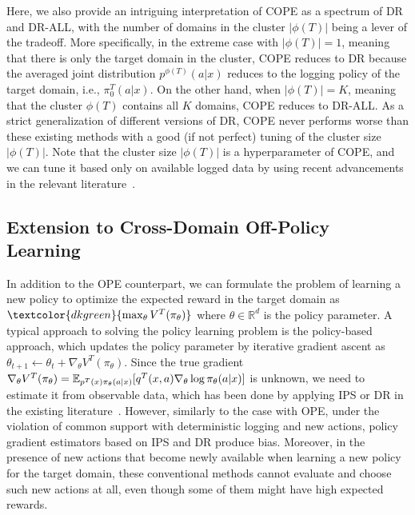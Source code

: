\documentclass{article} %
\theoremstyle{definition}
\begin{document}
Here, we also provide an intriguing interpretation of COPE as a spectrum of DR and DR-ALL, with the number of domains in the cluster $|\phi(T)|$ being a lever of the tradeoff. More specifically, in the extreme case with $|\phi(T)|=1$, meaning that there is only the target domain in the cluster, COPE reduces to DR because the averaged joint distribution $p^{\phi(T)}(a|x)$ reduces to the logging policy of the target domain, i.e., $\pi_0^T(a|x)$. On the other hand, when $|\phi(T)|=K$, meaning that the cluster $\phi(T)$ contains all $K$ domains, COPE reduces to DR-ALL. As a strict generalization of different versions of DR, COPE never performs worse than these existing methods with a good (if not perfect) tuning of the cluster size $|\phi(T)|$. Note that the cluster size $|\phi(T)|$ is a hyperparameter of COPE, and we can tune it based only on available logged data by using recent advancements in the relevant literature~\citep{su2020adaptive,udagawa2023policy,felicioni2024autoope,cief2024cross}.


\subsection{Extension to Cross-Domain Off-Policy Learning}
In addition to the OPE counterpart, we can formulate the problem of learning a new policy to optimize the expected reward in the target domain as $\textcolor{dkgreen}{\max_{\theta} V^T(\pi_{\theta})}$ where $\theta \in \mathbb{R}^{d}$ is the policy parameter. 
A typical approach to solving the policy learning problem is the policy-based approach, which updates the policy parameter by iterative gradient ascent as $\theta_{t+1} \leftarrow \theta_{t} + \nabla_{\theta}V^T(\pi_{\theta})$. 
Since the true gradient $\nabla_{\theta}V^T(\pi_{\theta})=\mathbb{E}_{p^T(x)\pi_{\theta}(a|x)}[q^T(x,a)\nabla_{\theta}\log\pi_{\theta}(a|x)]$ is unknown, we need to estimate it from observable data, which has been done by applying IPS or DR in the existing literature~\citep{su2019cab,metelli2021subgaussian}. 
However, similarly to the case with OPE, under the violation of common support with deterministic logging and new actions, policy gradient estimators based on IPS and DR produce bias.  Moreover, in the presence of new actions that become newly available when learning a new policy for the target domain, these conventional methods cannot evaluate and choose such new actions at all, even though some of them might have high expected rewards.
\end{document}
